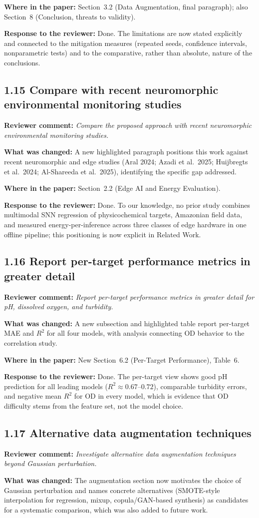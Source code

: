 \documentclass[11pt,a4paper]{article}
\newcommand{\comment}[1]{\textbf{Reviewer comment:} \textit{#1}}
\newcommand{\change}[1]{\textbf{What was changed:} #1}
\newcommand{\where}[1]{\textbf{Where in the paper:} #1}
\newcommand{\resp}[1]{\textbf{Response to the reviewer:} \textcolor{revblue}{#1}}
\newcommand{\pt}[1]{\subsection*{#1}}
\begin{document}
\where{Section~3.2 (Data Augmentation, final paragraph); also Section~8 (Conclusion, threats to validity).}

\resp{Done. The limitations are now stated explicitly and connected to the mitigation measures (repeated seeds, confidence intervals, nonparametric tests) and to the comparative, rather than absolute, nature of the conclusions.}

\pt{1.15 Compare with recent neuromorphic environmental monitoring studies}
\comment{Compare the proposed approach with recent neuromorphic environmental monitoring studies.}

\change{A new highlighted paragraph positions this work against recent neuromorphic and edge studies (Aral 2024; Azadi et al.\ 2025; Huijbregts et al.\ 2024; Al-Shareeda et al.\ 2025), identifying the specific gap addressed.}

\where{Section~2.2 (Edge AI and Energy Evaluation).}

\resp{Done. To our knowledge, no prior study combines multimodal SNN regression of physicochemical targets, Amazonian field data, and measured energy-per-inference across three classes of edge hardware in one offline pipeline; this positioning is now explicit in Related Work.}

\pt{1.16 Report per-target performance metrics in greater detail}
\comment{Report per-target performance metrics in greater detail for pH, dissolved oxygen, and turbidity.}

\change{A new subsection and highlighted table report per-target MAE and $R^2$ for all four models, with analysis connecting OD behavior to the correlation study.}

\where{New Section~6.2 (Per-Target Performance), Table~6.}

\resp{Done. The per-target view shows good pH prediction for all leading models ($R^2 \approx 0.67$--$0.72$), comparable turbidity errors, and negative mean $R^2$ for OD in every model, which is evidence that OD difficulty stems from the feature set, not the model choice.}

\pt{1.17 Alternative data augmentation techniques}
\comment{Investigate alternative data augmentation techniques beyond Gaussian perturbation.}

\change{The augmentation section now motivates the choice of Gaussian perturbation and names concrete alternatives (SMOTE-style interpolation for regression, mixup, copula/GAN-based synthesis) as candidates for a systematic comparison, which was also added to future work.}
\end{document}
